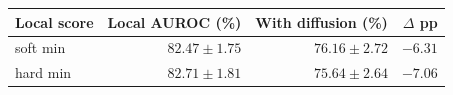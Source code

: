 \begin{tabular}{lrrr}
\toprule
\textbf{Local score} & \textbf{Local AUROC (\%)} & \textbf{With diffusion (\%)} & \textbf{$\Delta$ pp}\\
\midrule
soft min & $82.47\pm1.75$ & $76.16\pm2.72$ & $-6.31$\\
hard min & $82.71\pm1.81$ & $75.64\pm2.64$ & $-7.06$\\
\bottomrule
\end{tabular}
